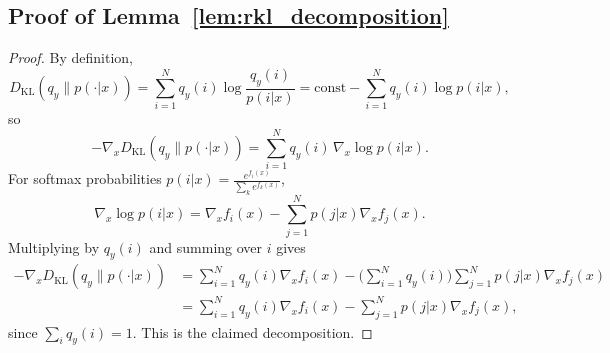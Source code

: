 \documentclass{article}
\begin{document}
\subsection{Proof of Lemma~\ref{lem:rkl_decomposition}}
\label{app:proof_lemma}
\begin{proof}
By definition,
\begin{equation}
D_{\mathrm{KL}}(q_y\|p(\cdot|x))=\sum_{i=1}^N q_y(i)\log\frac{q_y(i)}{p(i|x)}
=
\text{const} - \sum_{i=1}^N q_y(i)\log p(i|x),
\end{equation}
so
\begin{equation}
-\nabla_x D_{\mathrm{KL}}(q_y\|p(\cdot|x))=\sum_{i=1}^N q_y(i)\,\nabla_x \log p(i|x).
\end{equation}
For softmax probabilities $p(i|x)=\frac{e^{f_i(x)}}{\sum_k e^{f_k(x)}}$,
\begin{equation}
\nabla_x \log p(i|x)=\nabla_x f_i(x)-\sum_{j=1}^N p(j|x)\nabla_x f_j(x).
\end{equation}
Multiplying by $q_y(i)$ and summing over $i$ gives
\begin{align}
-\nabla_x D_{\mathrm{KL}}(q_y\|p(\cdot|x))
&=
\sum_{i=1}^N q_y(i)\nabla_x f_i(x)
-
\Big(\sum_{i=1}^N q_y(i)\Big)\sum_{j=1}^N p(j|x)\nabla_x f_j(x) \nonumber\\
&=
\sum_{i=1}^N q_y(i)\nabla_x f_i(x)
-
\sum_{j=1}^N p(j|x)\nabla_x f_j(x),
\end{align}
since $\sum_i q_y(i)=1$. This is the claimed decomposition.
\end{proof}
\end{document}
